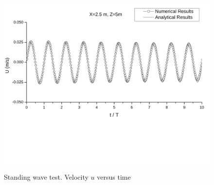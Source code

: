 \begin{figure}[htbp]
\vspace{0.25in}
\hspace{0.0in}
\includegraphics[scale=0.50]{../figures/StanWav/StanWav-U-vs-Time-X=25-Z=5.pdf}
\label{fig:StanWav-U-vs-Time-X-25-Z-5}
\caption{Standing wave test. Velocity $u$ versus time}
\end{figure}

\cp

